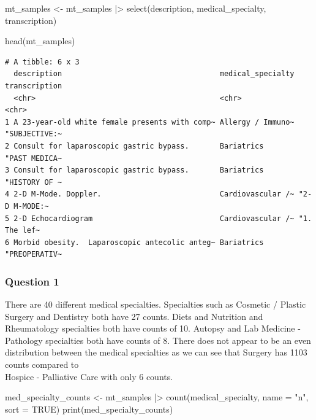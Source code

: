 \documentclass[
  letterpaper,
  DIV=11,
  numbers=noendperiod]{scrartcl}
\newenvironment{Shaded}{\begin{snugshade}}{\end{snugshade}}
\newcommand{\AttributeTok}[1]{\textcolor[rgb]{0.40,0.45,0.13}{#1}}
\newcommand{\ConstantTok}[1]{\textcolor[rgb]{0.56,0.35,0.01}{#1}}
\newcommand{\FunctionTok}[1]{\textcolor[rgb]{0.28,0.35,0.67}{#1}}
\newcommand{\NormalTok}[1]{\textcolor[rgb]{0.00,0.23,0.31}{#1}}
\newcommand{\OtherTok}[1]{\textcolor[rgb]{0.00,0.23,0.31}{#1}}
\newcommand{\SpecialCharTok}[1]{\textcolor[rgb]{0.37,0.37,0.37}{#1}}
\newcommand{\StringTok}[1]{\textcolor[rgb]{0.13,0.47,0.30}{#1}}
\begin{document}
\begin{Shaded}
\begin{Highlighting}[]
\NormalTok{mt\_samples }\OtherTok{\textless{}{-}}\NormalTok{ mt\_samples }\SpecialCharTok{|\textgreater{}}
  \FunctionTok{select}\NormalTok{(description, medical\_specialty, transcription)}

\FunctionTok{head}\NormalTok{(mt\_samples)}
\end{Highlighting}
\end{Shaded}

\begin{verbatim}
# A tibble: 6 x 3
  description                                    medical_specialty transcription
  <chr>                                          <chr>             <chr>        
1 A 23-year-old white female presents with comp~ Allergy / Immuno~ "SUBJECTIVE:~
2 Consult for laparoscopic gastric bypass.       Bariatrics        "PAST MEDICA~
3 Consult for laparoscopic gastric bypass.       Bariatrics        "HISTORY OF ~
4 2-D M-Mode. Doppler.                           Cardiovascular /~ "2-D M-MODE:~
5 2-D Echocardiogram                             Cardiovascular /~ "1.  The lef~
6 Morbid obesity.  Laparoscopic antecolic anteg~ Bariatrics        "PREOPERATIV~
\end{verbatim}

\subsubsection{Question 1}\label{question-1}

There are 40 different medical specialties. Specialties such as Cosmetic
/ Plastic Surgery and Dentistry both have 27 counts. Diets and Nutrition
and Rheumatology specialties both have counts of 10. Autopsy and Lab
Medicine - Pathology specialties both have counts of 8. There does not
appear to be an even distribution between the medical specialties as we
can see that Surgery has 1103 counts compared to\\
Hospice - Palliative Care with only 6 counts.

\begin{Shaded}
\begin{Highlighting}[]
\NormalTok{med\_specialty\_counts }\OtherTok{\textless{}{-}}\NormalTok{ mt\_samples }\SpecialCharTok{|\textgreater{}}
  \FunctionTok{count}\NormalTok{(medical\_specialty, }\AttributeTok{name =} \StringTok{"n"}\NormalTok{, }\AttributeTok{sort =} \ConstantTok{TRUE}\NormalTok{)}
\FunctionTok{print}\NormalTok{(med\_specialty\_counts)}
\end{Highlighting}
\end{Shaded}
\end{document}
